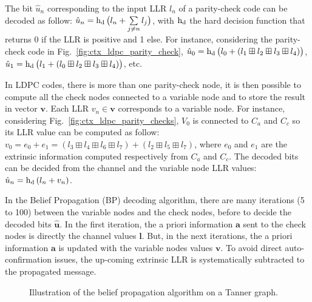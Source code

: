 The bit $\hat{u}_n$ corresponding to the input LLR $l_n$ of a parity-check code
can be decoded as follow: $\hat{u}_n = \operatorname{h_d}\big(l_n +
\sum\limits_{j \neq n}{l_j}\big)$, with $\operatorname{h_d}$ the hard decision function
that returns 0 if the LLR is positive and 1 else. For instance, considering the
parity-check code in Fig.~\ref{fig:ctx_ldpc_parity_check}, $\hat{u}_0 =
\operatorname{h_d}\big(l_0 + (l_1 \boxplus l_2 \boxplus l_3 \boxplus l_4)\big)$,
$\hat{u}_1 = \operatorname{h_d}\big(l_1 + (l_0 \boxplus l_2 \boxplus l_3 \boxplus
l_4)\big)$, etc.

In LDPC codes, there is more than one parity-check node, it is then possible to
compute all the check nodes connected to a variable node and to store the result
in vector $\bm{v}$. Each LLR $v_n \in \bm{v}$ corresponds to a variable node.
For instance, considering Fig.~\ref{fig:ctx_ldpc_parity_checks}, $V_0$ is
connected to $C_a$ and $C_c$ so its LLR value can be computed as follow: $v_0
= e_0 + e_1 = (l_3 \boxplus l_4 \boxplus l_6 \boxplus l_7) + (l_2 \boxplus l_5
\boxplus l_7)$, where $e_0$ and $e_1$ are the extrinsic information computed
respectively from $C_a$ and $C_c$. The decoded bits can be decided from the
channel and the variable node LLR values: $\hat{u}_n = \operatorname{h_d}{(l_n + v_n)}$.

In the Belief Propagation (BP) decoding algorithm, there are many iterations (5
to 100) between the variable nodes and the check nodes, before to decide the
decoded bits $\bm{\hat{u}}$. In the first iteration, the a priori information
$\bm{a}$ sent to the check nodes is directly the channel values $\bm{l}$. But,
in the next iterations, the a priori information $\bm{a}$ is updated with the
variable nodes values $\bm{v}$. To avoid direct auto-confirmation issues, the
up-coming extrinsic LLR is systematically subtracted to the propagated message.

\begin{figure}[htp]
  \centering
  \quad
  \caption{Illustration of the belief propagation algorithm on a Tanner graph.}
  \label{fig:ctx_ldpc_bp}
\end{figure}

